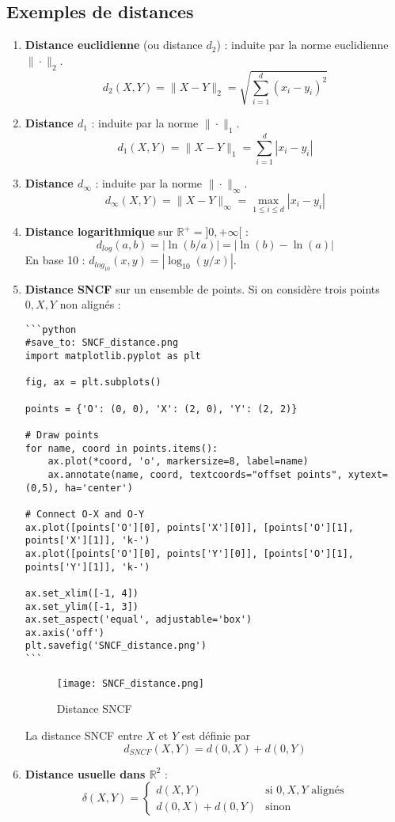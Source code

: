 \documentclass[oneside]{book}
\begin{document}
\subsection{Exemples de distances}

\begin{enumerate}
    \item \textbf{Distance euclidienne} (ou distance $d_2$) : induite par la norme euclidienne $\|\cdot\|_2$.
    \[
    d_2(X, Y) = \|X - Y\|_2 = \sqrt{\sum_{i=1}^d (x_i - y_i)^2}
    \]
    \item \textbf{Distance $d_1$} : induite par la norme $\|\cdot\|_1$.
    \[
    d_1(X, Y) = \|X - Y\|_1 = \sum_{i=1}^d |x_i - y_i|
    \]
    \item \textbf{Distance $d_\infty$} : induite par la norme $\|\cdot\|_\infty$.
    \[
    d_\infty(X, Y) = \|X - Y\|_\infty = \max_{1 \leq i \leq d} |x_i - y_i|
    \]
    \item \textbf{Distance logarithmique} sur $\mathbb{R}^+ = ]0, +\infty[$ :
    \[
    d_{log}(a, b) = |\ln(b/a)| = |\ln(b) - \ln(a)|
    \]
    En base 10 : $d_{log_{10}}(x, y) = |\log_{10}(y/x)|$.

    \item \textbf{Distance SNCF} sur un ensemble de points. Si on considère trois points $0, X, Y$ non alignés :

\begin{verbatim}
```python
#save_to: SNCF_distance.png
import matplotlib.pyplot as plt

fig, ax = plt.subplots()

points = {'O': (0, 0), 'X': (2, 0), 'Y': (2, 2)}

# Draw points
for name, coord in points.items():
    ax.plot(*coord, 'o', markersize=8, label=name)
    ax.annotate(name, coord, textcoords="offset points", xytext=(0,5), ha='center')

# Connect O-X and O-Y
ax.plot([points['O'][0], points['X'][0]], [points['O'][1], points['X'][1]], 'k-')
ax.plot([points['O'][0], points['Y'][0]], [points['O'][1], points['Y'][1]], 'k-')

ax.set_xlim([-1, 4])
ax.set_ylim([-1, 3])
ax.set_aspect('equal', adjustable='box')
ax.axis('off')
plt.savefig('SNCF_distance.png')
```
\end{verbatim}

\begin{figure}[H]
    \centering
    \texttt{[image: SNCF\_distance.png]}
    \caption{Distance SNCF}
    \label{fig:sncf_distance}
\end{figure}
    La distance SNCF entre $X$ et $Y$ est définie par
    \[
    d_{SNCF}(X, Y) = d(0, X) + d(0, Y)
    \]

    \item \textbf{Distance usuelle dans $\mathbb{R}^2$} :
    \[
    \delta(X, Y) =
    \begin{cases}
        d(X, Y) & \text{si } 0, X, Y \text{ alignés} \\
        d(0, X) + d(0, Y) & \text{sinon}
    \end{cases}
    \]
\end{enumerate}
\end{document}
